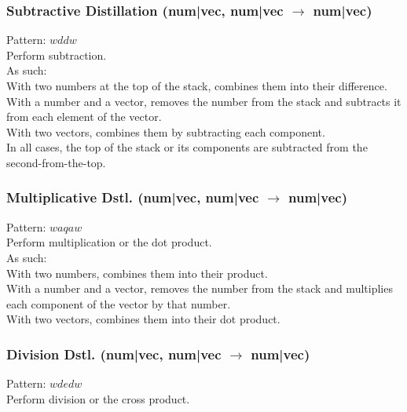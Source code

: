 \documentclass[12pt]{article}
\begin{document}
\subsubsection*{Subtractive Distillation (num|vec, num|vec $\rightarrow$ num|vec)}

    Pattern: $wddw$\\
      Perform subtraction.\\


  
    As such:\\With two numbers at the top of the stack, combines them into their difference.\\With a number and a vector, removes the number from the stack and subtracts it from each element of the vector.\\With two vectors, combines them by subtracting each component.\\In all cases, the top of the stack or its components are subtracted from the second-from-the-top.\\


  \label{sec: patterns/math@hexcasting:mul}
\subsubsection*{Multiplicative Dstl. (num|vec, num|vec $\rightarrow$ num|vec)}

    Pattern: $waqaw$\\
      Perform multiplication or the dot product.\\


  
    As such:\\With two numbers, combines them into their product.\\With a number and a vector, removes the number from the stack and multiplies each component of the vector by that number.\\With two vectors, combines them into their dot product.\\


  \label{sec: patterns/math@hexcasting:div}
\subsubsection*{Division Dstl. (num|vec, num|vec $\rightarrow$ num|vec)}

    Pattern: $wdedw$\\
      Perform division or the cross product.\\
\end{document}
